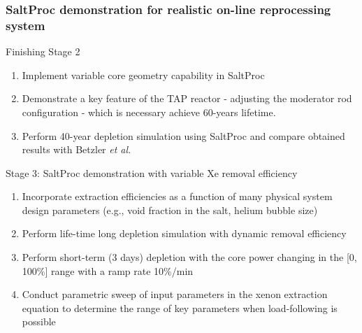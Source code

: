 

\begin{frame}
\frametitle{SaltProc demonstration for realistic on-line reprocessing system}
	\begin{block}{Finishing Stage 2}
		\begin{enumerate}
			\item Implement variable core geometry capability in SaltProc
			\item Demonstrate a key feature of
the \gls{TAP} reactor - 
			adjusting the moderator rod configuration - which is necessary 
			achieve 60-years lifetime.
			\item Perform 40-year depletion simulation using SaltProc 
			and compare obtained results with Betzler \emph{et al.} 
			\cite{betzler_assessment_2017}
		\end{enumerate}
	\end{block}
	
	\begin{block}{Stage 3: SaltProc demonstration with variable Xe removal 
	efficiency}
		\begin{enumerate}
			\item Incorporate extraction efficiencies as a function of many 
			physical system design
parameters (e.g., void fraction in the 
			salt, helium bubble size)
			\item Perform life-time long depletion simulation with dynamic 
			removal efficiency
			\item Perform short-term (3 days) depletion with the core power 
			changing in the [0, 100\%] range with a ramp rate 10\%/min
			\item Conduct parametric sweep of input parameters in the xenon 
			extraction equation to determine the range of key parameters when 
			load-following is possible
		\end{enumerate}
	\end{block}
\end{frame}


